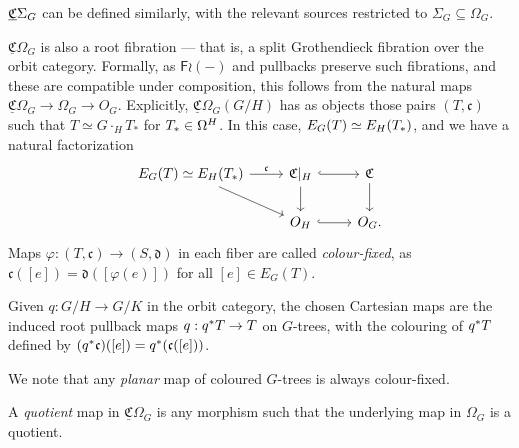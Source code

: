 \documentclass[psamsfonts,onesided,10pt
,draft
]{amsart}%
\renewcommand{\phi}{\varphi}
\newcommand{\UC}{\underline{\mathfrak C}}
\begin{document}
\begin{remark}
        $\underline{\mathfrak C} \Sigma_G$ can be defined similarly, with the relevant sources restricted to
        $\Sigma_G \subseteq \Omega_G$. 
\end{remark}


\begin{remark}
      $\underline{\mathfrak C}\Omega_G$ is also a root fibration ---
      that is, a split Grothendieck fibration over the orbit category.
      Formally, as $\mathsf F \wr (-)$ and pullbacks preserve such fibrations, and these are compatible under composition,
      this follows from the natural maps $\underline{\mathfrak C}\Omega_G \to \Omega_G \to O_G$.
      Explicitly, $\underline{\mathfrak C}\Omega_G(G/H)$ has as objects those pairs $(T,\mathfrak c)$ such that
      $T \simeq G \cdot_H T_*$ for $T_{\**} \in \Omega^H$.
      In this case, $E_G(T) \simeq E_H(T_{\**})$, and we have a natural factorization
      \begin{equation}
            \begin{tikzcd}
                  E_G(T) \simeq E_H(T_{\**}) \arrow[r, "\mathfrak c"] \arrow[dr]
                  &
                  \mathfrak C|_{H} \arrow[r, hookrightarrow] \arrow[d]
                  &
                  \mathfrak C \arrow[d]
                  \\
                  &
                  O_H \arrow[r, hookrightarrow]
                  &
                  O_G.
            \end{tikzcd}
      \end{equation}
      Maps $\phi:(T,\mathfrak c) \to (S, \mathfrak d)$ in each fiber are called \textit{colour-fixed},
      as $\mathfrak c([e]) = \mathfrak d([\phi (e)])$ for all $[e] \in E_G(T)$.
      
      Given $q: G/H \to G/K$ in the orbit category,
      the chosen Cartesian maps are the induced root pullback maps $q: q^{\**}T \to T$ on $G$-trees,
      with the colouring of $q^{\**}T$ defined by $(q^{\**}\mathfrak c)([e]) = q^{\**}(\mathfrak c([e]))$.
\end{remark}

\begin{remark}
      We note that any \textit{planar} map of coloured $G$-trees is always colour-fixed.
\end{remark}

\begin{remark}
      A \textit{quotient} map in $\UC \Omega_G$ is any morphism such that the underlying map in $\Omega_G$ is a quotient.
\end{remark}
\end{document}
